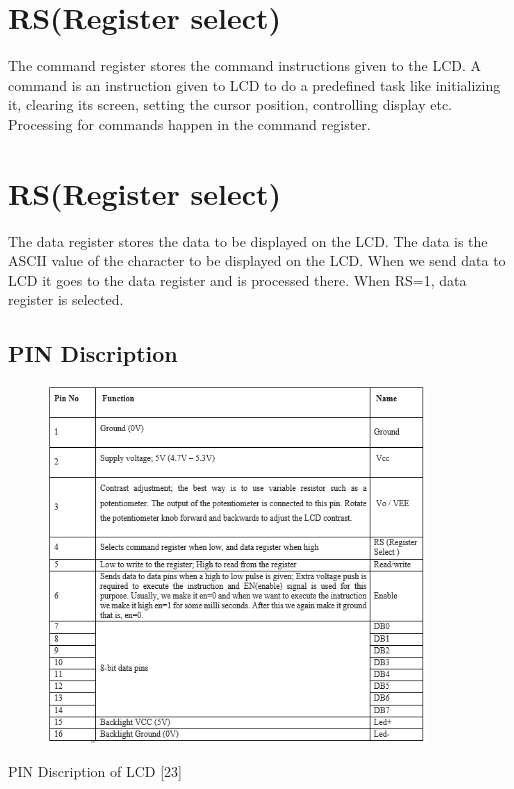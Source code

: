 \documentclass[twoside,a4paper,16pt]{book}
\begin{document}
{{			\section*{RS(Register select)}
			The command register stores the command instructions given to the LCD. A command is an instruction given to LCD to do a predefined task like initializing it, clearing its screen, setting the cursor position, controlling display etc. Processing for commands happen in the command register.
			\section*{RS(Register select)}
			The data register stores the data to be displayed on the LCD. The data is the ASCII value of the character to be displayed on the LCD. When we send data to LCD it goes to the data register and is processed there. When RS=1, data register is selected.
			
			
			
			\newpage
			\subsection{PIN Discription}
			\begin{figure}[ht!]
				\begin{center}
					\includegraphics[width=10.0cm]{18.png}
				\end{center}
			\end{figure}
			
			\begin{table}[!ht]
				
				\caption{PIN Discription of LCD [23]}
			\end{table}
			
}}
\end{document}
